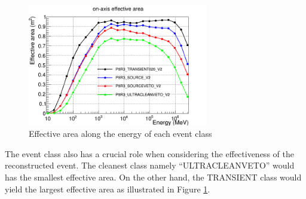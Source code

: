 \begin{figure}[h!]
    \centering
    \includegraphics[width=0.7\textwidth]{content/background/figures/eff_event_class.png}
    \caption{Effective area along the energy of each event class \citep{lat_p8_performance}}
    \label{fig:eff_event_class}
\end{figure}


The event class also has a crucial role when considering the effectiveness of the reconstructed event.
The cleanest class namely ``ULTRACLEANVETO'' would has the smallest
effective area. On the other hand, the TRANSIENT class would yield 
the largest effective area as illustrated in Figure \ref{fig:eff_event_class}.
